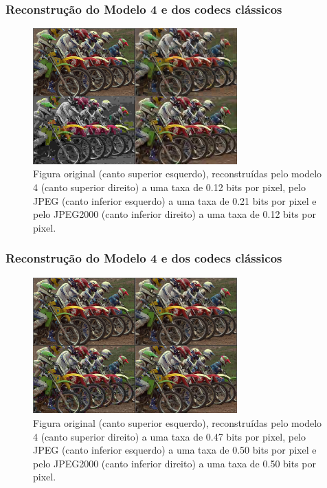 \documentclass{beamer}
\begin{document}
\begin{frame}
\frametitle{Reconstrução do Modelo 4 e dos codecs clássicos}
\begin{figure}
    \centering
    \includegraphics[width=0.7\textwidth]{figs/comparison_kodim05_0.png}
    \caption{Figura original (canto superior esquerdo), reconstruídas pelo modelo 4 (canto superior direito) a uma taxa de 0.12 bits por pixel, pelo JPEG (canto inferior esquerdo) a uma taxa de 0.21 bits por pixel e pelo JPEG2000 (canto inferior direito) a uma taxa de 0.12 bits por pixel. }
    \label{fig:mod4:kodim05:0}
\end{figure}
\end{frame}
\begin{frame}
\frametitle{Reconstrução do Modelo 4 e dos codecs clássicos}
\begin{figure}
    \centering
    \includegraphics[width=0.7\textwidth]{figs/comparison_kodim05_3.png}
    \caption{Figura original (canto superior esquerdo), reconstruídas pelo modelo 4 (canto superior direito) a uma taxa de 0.47 bits por pixel, pelo JPEG (canto inferior esquerdo) a uma taxa de 0.50 bits por pixel e pelo JPEG2000 (canto inferior direito) a uma taxa de 0.50 bits por pixel. }
    \label{fig:mod4:kodim05:3}
\end{figure}
\end{frame}
\end{document}
